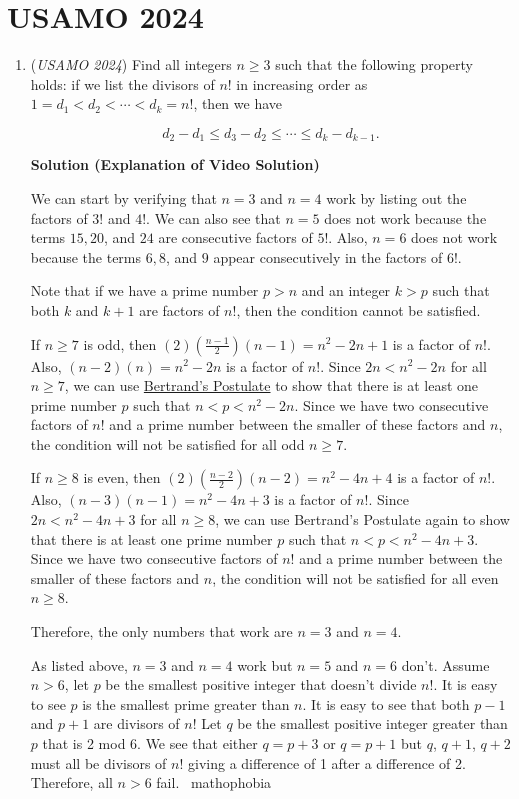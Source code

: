 \section{USAMO 2024}
        \begin{enumerate}
        	\item (\textit{USAMO 2024}) Find all integers $n \geq 3$ such that the following property holds: if we list the divisors of $n !$ in increasing order as $1=d_1<d_2<\cdots<d_k=n!$, then we have


 
 \[d_2-d_1 \leq d_3-d_2 \leq \cdots \leq d_k-d_{k-1}.\]




\textbf{Solution (Explanation of Video Solution)}

We can start by verifying that $n=3$ and $n=4$ work by listing out the factors of $3!$ and $4!$. We can also see that $n=5$ does not work because the terms $15, 20$, and $24$ are consecutive factors of $5!$. Also, $n=6$ does not work because the terms $6, 8$, and $9$ appear consecutively in the factors of $6!$.

 Note that if we have a prime number $p>n$ and an integer $k>p$ such that both $k$ and $k+1$ are factors of $n!$, then the condition cannot be satisfied.

 If $n\geq7$ is odd, then $(2)(\frac{n-1}{2})(n-1)=n^2-2n+1$ is a factor of $n!$. Also, $(n-2)(n)=n^2-2n$ is a factor of $n!$. Since $2n<n^2-2n$ for all $n\geq7$, we can use \href{https://artofproblemsolving.com/wiki/index.php?title=Bertrand\%27s\_Postulate}{Bertrand's Postulate} to show that there is at least one prime number $p$ such that $n<p<n^2-2n$. Since we have two consecutive factors of $n!$ and a prime number between the smaller of these factors and $n$, the condition will not be satisfied for all odd $n\geq7$.

 If $n\geq8$ is even, then $(2)(\frac{n-2}{2})(n-2)=n^2-4n+4$ is a factor of $n!$. Also, $(n-3)(n-1)=n^2-4n+3$ is a factor of $n!$. Since $2n<n^2-4n+3$ for all $n\geq8$, we can use Bertrand's Postulate again to show that there is at least one prime number $p$ such that $n<p<n^2-4n+3$. Since we have two consecutive factors of $n!$ and a prime number between the smaller of these factors and $n$, the condition will not be satisfied for all even $n\geq8$.

 Therefore, the only numbers that work are $n=3$ and $n=4$.

 As listed above, $n=3$ and $n=4$ work but $n=5$ and $n=6$ don't. Assume $n>6$, let $p$ be the smallest positive integer that doesn't divide $n!$. It is easy to see $p$ is the smallest prime greater than $n$. It is easy to see that both $p-1$ and $p+1$ are divisors of $n!$ Let $q$ be the smallest positive integer greater than $p$ that is 2 mod 6. We see that either $q=p+3$ or $q=p+1$ but $q$, $q+1$, $q+2$ must all be divisors of $n!$ giving a difference of 1 after a difference of 2. Therefore, all $n>6$ fail. ~mathophobia


\end{enumerate}
